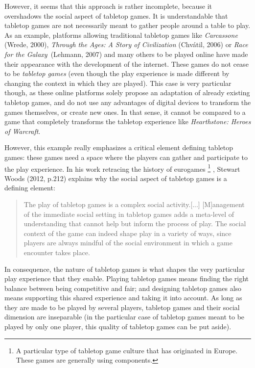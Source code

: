 However, it seems that this approach is rather incomplete, because it overshadows the social aspect of tabletop games. It is understandable that tabletop games are not necessarily meant to gather people around a table to play. As an example, platforms allowing traditional tabletop games like \textit{Carcassone} (Wrede, 2000)\cite{game:carca}, \textit{Through the Ages: A Story of Civilization} (Chvátil, 2006)\cite{game:ages} or \textit{Race for the Galaxy}\ (Lehmann, 2007)\cite{game:race} and many others to be played online have made their appearance with the development of the internet.
These games do not cease to be \textit{tabletop games} (even though the play experience is made different by changing the context in which they are played). This case is very particular though, as these online platforms solely propose an adaptation of already existing tabletop games, and do not use any advantages of digital devices to transform the games themselves, or create new ones. 
In that sense, it cannot be compared to a game that completely transforms the tabletop experience like \textit{Hearthstone: Heroes of Warcraft}. 

However, this example really emphasizes a critical element defining tabletop games: these games need a space where the players can gather and participate to the play experience. In his work retracing the history of eurogames
\footnote{A particular type of tabletop game culture that has originated in Europe. These games are generally using components.}
, Stewart Woods (2012, p.212)\cite{book:euro} explains why the social aspect of tabletop games is a defining element:

\begin{quotation}
The play of tabletop games is a complex social activity.[...] [M]anagement of the immediate social setting in tabletop games adds a meta-level of understanding that cannot help but inform the process of play. The social context of the game can indeed shape play in a variety of ways, since players are always mindful of the social environment in which a game encounter takes place.
\end{quotation}

In consequence, the nature of tabletop games is what shapes the very particular play experience that they enable. Playing tabletop games means finding the right balance between being competitive and fair; and designing tabletop games also means supporting this shared experience and taking it into account. As long as they are made to be played by several players, tabletop games and their social dimension are inseparable (in the particular case of tabletop games meant to be played by only one player, this quality of tabletop games can be put aside).

